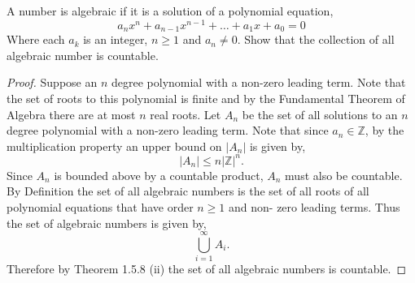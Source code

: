 \documentclass[12pt]{article}
\makeatletter
\theoremstyle{homework}
\newenvironment{exercise}[1]
{\def\@currentlabel{#1}\exercisecore}
{\endexercisecore}
\newcommand{\Ints}{\ensuremath{\mathbb Z}}
\makeatother
\begin{document}
\begin{exercise}{2} A number is algebraic if it is a solution of a polynomial equation,
  \begin{equation*}
    a_nx^n + a_{n-1}x^{n-1}+\dots+a_1x + a_0 = 0
  \end{equation*}
  Where each $a_k$ is an integer, $n \geq 1$ and $a_n \neq 0$. Show that the collection of all algebraic 
  number is countable.\\

  \begin{proof}
    Suppose an $n$ degree polynomial with a non-zero leading term. Note that the set of roots to this polynomial
    is finite and by the Fundamental Theorem of Algebra there are at most $n$ real roots. Let $A_n$ be the set of all
    solutions to an $n$ degree polynomial with a non-zero leading term. Note that since $a_n \in \Ints$, by the multiplication property an upper 
    bound on $|A_n|$ is given by,
    \begin{equation*}
      |A_n| \le n|\Ints|^n.
    \end{equation*} 
    Since $A_n$ is bounded above by a countable product, $A_n$ must also be countable. By Definition the set of all algebraic
    numbers is the set of all roots of all polynomial equations that have order $n \geq 1$ and non- zero leading terms. Thus 
    the set of algebraic numbers is given by,
    \begin{equation*}
      \bigcup_{i = 1}^{\infty} A_i.
    \end{equation*}
    Therefore by Theorem 1.5.8 (ii) the set of all algebraic numbers is countable. 





  \end{proof}


\end{exercise}
\vspace{.5in}
\end{document}
